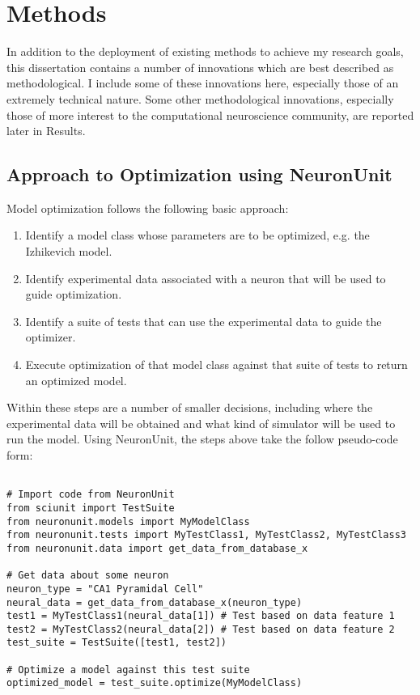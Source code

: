 \chapter{Methods}
In addition to the deployment of existing methods to achieve my research goals, this dissertation contains a number of innovations which are best described as methodological.  I include some of these innovations here, especially those of an extremely technical nature.  Some other methodological innovations, especially those of more interest to the computational neuroscience community, are reported later in Results.

\section{Approach to Optimization using NeuronUnit}
Model optimization follows the following basic approach:
\begin{enumerate}
	\item Identify a model class whose parameters are to be optimized, e.g. the Izhikevich model.
	\item Identify experimental data associated with a neuron that will be used to guide optimization.
	\item Identify a suite of tests that can use the experimental data to guide the optimizer.
	\item Execute optimization of that model class against that suite of tests to return an optimized model.
\end{enumerate}
Within these steps are a number of smaller decisions, including where the experimental data will be obtained and what kind of simulator will be used to run the model.
Using NeuronUnit, the steps above take the follow pseudo-code form:
\clearpage
\begin{verbatim}

# Import code from NeuronUnit
from sciunit import TestSuite
from neuronunit.models import MyModelClass
from neuronunit.tests import MyTestClass1, MyTestClass2, MyTestClass3
from neuronunit.data import get_data_from_database_x

# Get data about some neuron
neuron_type = "CA1 Pyramidal Cell"
neural_data = get_data_from_database_x(neuron_type)
test1 = MyTestClass1(neural_data[1]) # Test based on data feature 1
test2 = MyTestClass2(neural_data[2]) # Test based on data feature 2
test_suite = TestSuite([test1, test2])

# Optimize a model against this test suite
optimized_model = test_suite.optimize(MyModelClass)
\end{verbatim}


